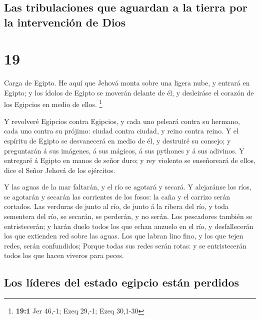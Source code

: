 \hypertarget{las-tribulaciones-que-aguardan-a-la-tierra-por-la-intervenciuxf3n-de-dios}{%
\subsection{Las tribulaciones que aguardan a la tierra por la
intervención de
Dios}\label{las-tribulaciones-que-aguardan-a-la-tierra-por-la-intervenciuxf3n-de-dios}}

\hypertarget{section-18}{%
\section{19}\label{section-18}}

 Carga de Egipto. He aquí que Jehová monta sobre una ligera
nube, y entrará en Egipto; y los ídolos de Egipto se moverán delante de
él, y desleiráse el corazón de los Egipcios en medio de ellos.
\footnote{\textbf{19:1} Jer 46,-1; Ezeq 29,-1; Ezeq 30,1-30}

 Y revolveré Egipcios contra Egipcios, y cada uno peleará
contra su hermano, cada uno contra su prójimo: ciudad contra ciudad, y
reino contra reino.  Y el espíritu de Egipto se desvanecerá
en medio de él, y destruiré su consejo; y preguntarán á sus imágenes, á
sus mágicos, á sus pythones y á sus adivinos.  Y entregaré á
Egipto en manos de señor duro; y rey violento se enseñoreará de ellos,
dice el Señor Jehová de los ejércitos.

 Y las aguas de la mar faltarán, y el río se agotará y
secará.  Y alejaránse los ríos, se agotarán y secarán las
corrientes de los fosos: la caña y el carrizo serán cortados.
 Las verduras de junto al río, de junto á la ribera del río,
y toda sementera del río, se secarán, se perderán, y no serán.
 Los pescadores también se entristecerán; y harán duelo
todos los que echan anzuelo en el río, y desfallecerán los que extienden
red sobre las aguas.  Los que labran lino fino, y los que
tejen redes, serán confundidos;  Porque todas sus redes
serán rotas: y se entristecerán todos los que hacen viveros para peces.

\hypertarget{los-luxedderes-del-estado-egipcio-estuxe1n-perdidos}{%
\subsection{Los líderes del estado egipcio están
perdidos}\label{los-luxedderes-del-estado-egipcio-estuxe1n-perdidos}}

